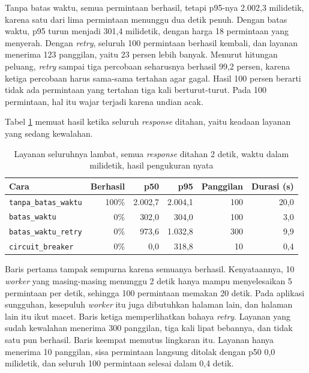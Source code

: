 Tanpa batas waktu, semua permintaan berhasil, tetapi p95-nya 2.002,3
milidetik, karena satu dari lima permintaan menunggu dua detik penuh. Dengan
batas waktu, p95 turun menjadi 301,4 milidetik, dengan harga 18 permintaan yang
menyerah. Dengan \textit{retry}, seluruh 100 permintaan berhasil kembali, dan
layanan menerima 123 panggilan, yaitu 23 persen lebih banyak. Menurut hitungan
peluang, \textit{retry} sampai tiga percobaan seharusnya berhasil 99,2 persen,
karena ketiga percobaan harus sama-sama tertahan agar gagal. Hasil 100 persen
berarti tidak ada permintaan yang tertahan tiga kali berturut-turut. Pada 100
permintaan, hal itu wajar terjadi karena undian acak.

Tabel \ref{tab:hasil-lambat} memuat hasil ketika seluruh \textit{response} ditahan,
yaitu keadaan layanan yang sedang kewalahan.

\begin{table}[!htb]
  \centering
  \caption{Layanan seluruhnya lambat, semua \textit{response} ditahan 2 detik, waktu
           dalam milidetik, hasil pengukuran nyata}
  \label{tab:hasil-lambat}
  \begin{tabularx}{\textwidth}{Xrrrrr}
    \hline
    \textbf{Cara} & \textbf{Berhasil} & \textbf{p50} & \textbf{p95} & \textbf{Panggilan} & \textbf{Durasi (s)} \\
    \hline
    \texttt{tanpa\_batas\_waktu} & 100\% & 2.002,7 & 2.004,1 & 100 & 20,0 \\
    \hline
    \texttt{batas\_waktu} & 0\% & 302,0 & 304,0 & 100 & 3,0 \\
    \hline
    \texttt{batas\_waktu\_retry} & 0\% & 973,6 & 1.032,8 & 300 & 9,9 \\
    \hline
    \texttt{circuit\_breaker} & 0\% & 0,0 & 318,8 & 10 & 0,4 \\
    \hline
  \end{tabularx}
\end{table}

Baris pertama tampak sempurna karena semuanya berhasil. Kenyataannya, 10
\textit{worker} yang masing-masing menunggu 2 detik hanya mampu menyelesaikan 5
permintaan per detik, sehingga 100 permintaan memakan 20 detik. Pada aplikasi
sungguhan, kesepuluh \textit{worker} itu juga dibutuhkan halaman lain, dan halaman lain
itu ikut macet. Baris ketiga memperlihatkan bahaya \textit{retry}. Layanan yang
sudah kewalahan menerima 300 panggilan, tiga kali lipat bebannya, dan tidak
satu pun berhasil. Baris keempat memutus lingkaran itu. Layanan hanya menerima
10 panggilan, sisa permintaan langsung ditolak dengan p50 0,0 milidetik, dan
seluruh 100 permintaan selesai dalam 0,4 detik.

